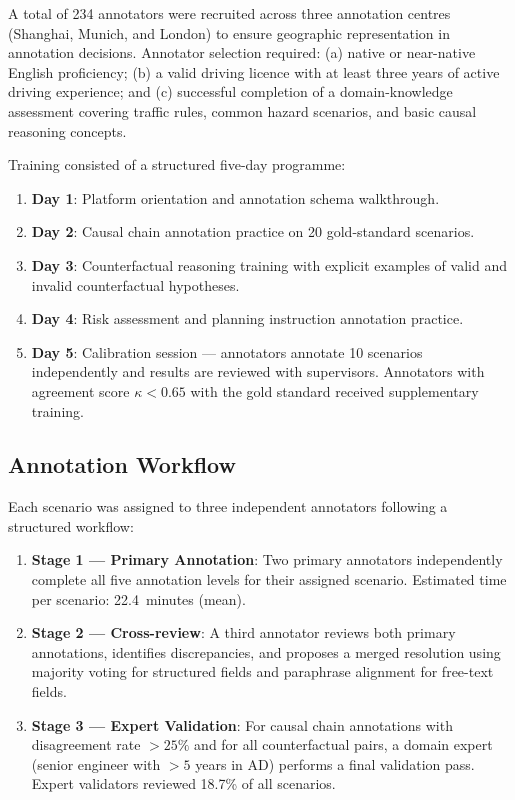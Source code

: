 A total of 234 annotators were recruited across three annotation centres (Shanghai,
Munich, and London) to ensure geographic representation in annotation decisions.
Annotator selection required: (a) native or near-native English proficiency; (b) a
valid driving licence with at least three years of active driving experience; and
(c) successful completion of a domain-knowledge assessment covering traffic rules,
common hazard scenarios, and basic causal reasoning concepts.

Training consisted of a structured five-day programme:
\begin{enumerate}[leftmargin=2em, noitemsep]
  \item \textbf{Day 1}: Platform orientation and annotation schema walkthrough.
  \item \textbf{Day 2}: Causal chain annotation practice on 20 gold-standard scenarios.
  \item \textbf{Day 3}: Counterfactual reasoning training with explicit examples of
        valid and invalid counterfactual hypotheses.
  \item \textbf{Day 4}: Risk assessment and planning instruction annotation practice.
  \item \textbf{Day 5}: Calibration session --- annotators annotate 10 scenarios independently
        and results are reviewed with supervisors. Annotators with agreement score
        $\kappa < 0.65$ with the gold standard received supplementary training.
\end{enumerate}

\subsection{Annotation Workflow}
\label{ssec:ann_workflow}

Each scenario was assigned to three independent annotators following a structured workflow:

\begin{enumerate}[leftmargin=2em, noitemsep]
  \item \textbf{Stage 1 --- Primary Annotation}: Two primary annotators independently
        complete all five annotation levels for their assigned scenario. Estimated time
        per scenario: 22.4~minutes (mean).
  \item \textbf{Stage 2 --- Cross-review}: A third annotator reviews both primary annotations,
        identifies discrepancies, and proposes a merged resolution using majority voting
        for structured fields and paraphrase alignment for free-text fields.
  \item \textbf{Stage 3 --- Expert Validation}: For causal chain annotations with disagreement
        rate $> 25\%$ and for all counterfactual pairs, a domain expert (senior engineer
        with $> 5$ years in AD) performs a final validation pass. Expert validators
        reviewed 18.7\% of all scenarios.
\end{enumerate}

